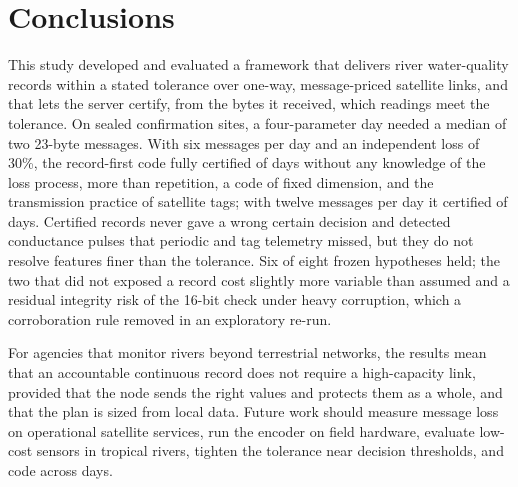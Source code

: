 \section{Conclusions}
\label{sec:conclusion}

This study developed and evaluated a framework that delivers river water-quality records within a stated tolerance over one-way, message-priced satellite links, and that lets the server certify, from the bytes it received, which readings meet the tolerance. On \nSitesConf{} sealed confirmation sites, a four-parameter day needed a median of two 23-byte messages. With six messages per day and an independent loss of 30\%, the record-first code fully certified \gCodeIidConf{} of days without any knowledge of the loss process, more than repetition, a code of fixed dimension, and the transmission practice of satellite tags; with twelve messages per day it certified \gTwelveIidConf{} of days. Certified records never gave a wrong certain decision and detected conductance pulses that periodic and tag telemetry missed, but they do not resolve features finer than the tolerance. Six of eight frozen hypotheses held; the two that did not exposed a record cost slightly more variable than assumed and a residual integrity risk of the 16-bit check under heavy corruption, which a corroboration rule removed in an exploratory re-run.

For agencies that monitor rivers beyond terrestrial networks, the results mean that an accountable continuous record does not require a high-capacity link, provided that the node sends the right values and protects them as a whole, and that the plan is sized from local data. Future work should measure message loss on operational satellite services, run the encoder on field hardware, evaluate low-cost sensors in tropical rivers, tighten the tolerance near decision thresholds, and code across days.

